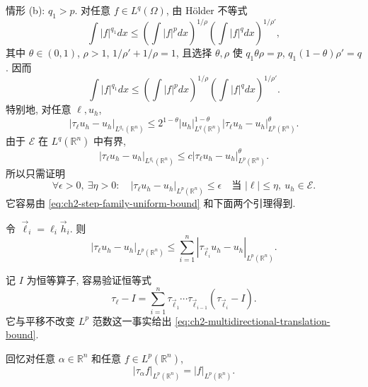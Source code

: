 \begin{Proof}
情形 (b): $q_1>p$. 对任意 $f\in L^q(\Omega)$, 由 Hölder 不等式
\[
\int|f|^{q_1}dx
\leq\left(\int|f|^pdx\right)^{1/\rho}
\left(\int|f|^qdx\right)^{1/\rho'},
\]
其中 $\theta\in(0,1)$, $\rho>1$, $1/\rho'+1/\rho=1$, 且选择 $\theta,\rho$ 使 $q_1\theta\rho=p$, $q_1(1-\theta)\rho'=q$. 因而
\begin{equation}
\int|f|^{q_1}dx
\leq\left(\int|f|^pdx\right)^{1/\rho}
\left(\int|f|^qdx\right)^{1/\rho'}.
\label{eq:ch2-step-compactness-interpolation}
\end{equation}
特别地, 对任意 $\ell,u_h$,
\[
|\tau_\ell u_h-u_h|_{L^{q_1}(\mathbb R^n)}
\leq2^{1-\theta}|u_h|_{L^q(\mathbb R^n)}^{1-\theta}
|\tau_\ell u_h-u_h|_{L^p(\mathbb R^n)}^\theta.
\]
由于 $\mathcal E$ 在 $L^q(\mathbb R^n)$ 中有界,
\begin{equation}
|\tau_\ell u_h-u_h|_{L^{q_1}(\mathbb R^n)}
\leq c|\tau_\ell u_h-u_h|_{L^p(\mathbb R^n)}^\theta.
\label{eq:ch2-step-compactness-interpolation-translation}
\end{equation}
所以只需证明
\begin{equation}
\forall\epsilon>0,\ \exists\eta>0:\quad
|\tau_\ell u_h-u_h|_{L^p(\mathbb R^n)}\leq\epsilon
\quad\text{当 }|\ell|\leq\eta,\ u_h\in\mathcal E.
\label{eq:ch2-step-compactness-lp-translation}
\end{equation}
它容易由 \eqref{eq:ch2-step-family-uniform-bound} 和下面两个引理得到.
\end{Proof}

\begin{Lemma}
\label{lem:ch2-multidirectional-translation}
令 $\vec\ell_i=\ell_i\vec h_i$. 则
\begin{equation}
|\tau_\ell u_h-u_h|_{L^p(\mathbb R^n)}
\leq\sum_{i=1}^{n}|\tau_{\vec\ell_i}u_h-u_h|_{L^p(\mathbb R^n)}.
\label{eq:ch2-multidirectional-translation-bound}
\end{equation}
\end{Lemma}

\begin{Proof}
记 $I$ 为恒等算子, 容易验证恒等式
\begin{equation}
\tau_\ell-I=\sum_{i=1}^{n}
\tau_{\vec\ell_1}\cdots\tau_{\vec\ell_{i-1}}(\tau_{\vec\ell_i}-I).
\label{eq:ch2-translation-telescoping-operator}
\end{equation}
它与平移不改变 $L^p$ 范数这一事实给出 \eqref{eq:ch2-multidirectional-translation-bound}.
\end{Proof}

\hypertarget{chapter-02-page-143}{}
回忆对任意 $\alpha\in\mathbb R^n$ 和任意 $f\in L^p(\mathbb R^n)$,
\begin{equation}
|\tau_\alpha f|_{L^p(\mathbb R^n)}=|f|_{L^p(\mathbb R^n)}.
\label{eq:ch2-translation-isometry}
\end{equation}

